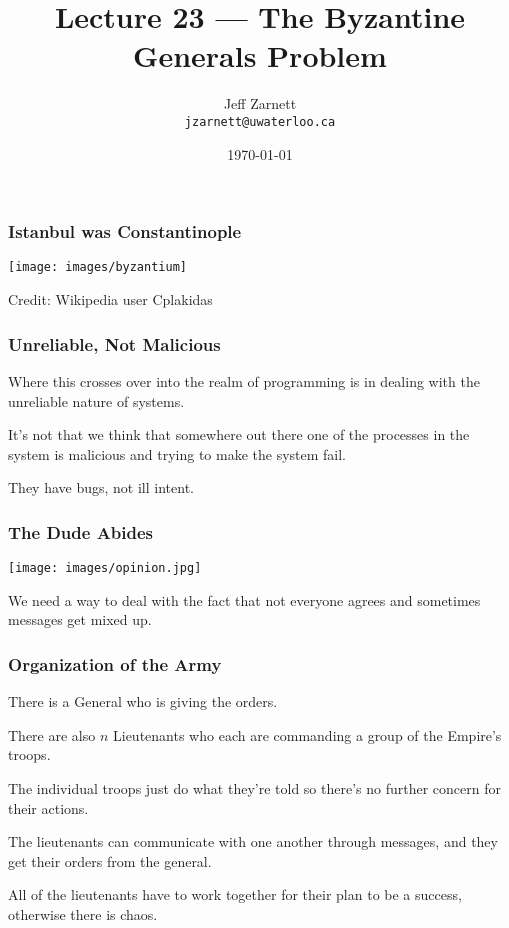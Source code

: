 

\title{Lecture 23 --- The Byzantine Generals Problem }

\author{Jeff Zarnett \\ \small \texttt{jzarnett@uwaterloo.ca}}
\date{\today}




\begin{frame}
	\titlepage

\end{frame}


\begin{frame}
	\frametitle{Istanbul was Constantinople}

	\begin{center}
		\texttt{[image: images/byzantium]}
	\end{center}

	Credit: Wikipedia user Cplakidas


\end{frame}

\begin{frame}
	\frametitle{Unreliable, Not Malicious}

	Where this crosses over into the realm of programming is in dealing with the unreliable nature of systems.

	It's not that we think that somewhere out there one of the processes in the system is malicious and trying to make the system fail.

	They have bugs, not ill intent.
\end{frame}


\begin{frame}
	\frametitle{The Dude Abides}
	\begin{center}
		\texttt{[image: images/opinion.jpg]}
	\end{center}

	We need a way to deal with the fact that not everyone agrees and sometimes messages get mixed up.

\end{frame}

\begin{frame}
	\frametitle{Organization of the Army}

	There is a \alert{General} who is giving the orders.

	There are also $n$ \alert{Lieutenants} who each are commanding a group of the Empire's troops.

	The individual troops just do what they're told so there's no further concern for their actions.

	The lieutenants can communicate with one another through messages, and they get their orders from the general.

	All of the lieutenants have to work together for their plan to be a success, otherwise there is chaos.
\end{frame}


